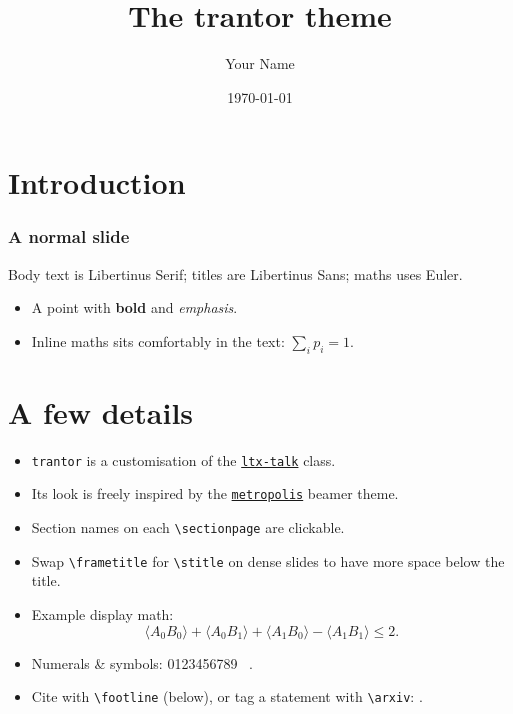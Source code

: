 \documentclass{ltx-talk} %
\title{The trantor theme}
\author{Your Name}
\institute{Your affiliation}
\date{\today}
\begin{document}
\maketitle

\outlinepage

\section{Introduction}\sectionpage

\begin{frame}
\frametitle{A normal slide}
  Body text is Libertinus Serif; titles are Libertinus Sans; maths uses Euler.
  \begin{itemize}
    \item A point with \textbf{bold} and \emph{emphasis}.
    \item Inline maths sits comfortably in the text: $\sum_i p_i = 1$.
  \end{itemize}
\end{frame}

\section{A few details}\sectionpage

\begin{frame}
  \begin{itemize}
      \item \texttt{trantor} is a customisation of the
         \href{https://ctan.org/pkg/ltx-talk}{\textcolor{TrantorAccent}{\texttt{ltx-talk}}} class.
      \item Its look is freely inspired by the
         \href{https://ctan.org/pkg/beamertheme-metropolis}{\textcolor{TrantorAccent}{\texttt{metropolis}}} beamer theme.
      \item Section names on each \texttt{\textbackslash sectionpage} are clickable.
      \item Swap \texttt{\textbackslash frametitle} for
         \texttt{\textbackslash stitle} on dense slides to have more
         space below the title.
       \item Example display math: \[
         \langle A_0 B_0 \rangle + \langle A_0 B_1\rangle +
         \langle A_1 B_0\rangle - \langle A_1 B_1\rangle \le 2 .
         \]
       \item Numerals \& symbols: 0123456789 \yes\ \no.
       \item Cite with \texttt{\textbackslash footline} (below), or tag a statement with \texttt{\textbackslash arxiv}: .
  \end{itemize}

\end{frame}
\end{document}
